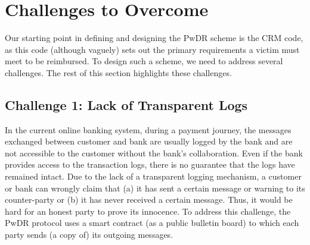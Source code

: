 

\section{Challenges to Overcome}\label{sec:: challenges}


Our starting point in defining and  designing the PwDR scheme is the CRM code, as this code (although vaguely) sets out the primary requirements a victim must meet to be reimbursed.  To design such a scheme, we need to address  several challenges. The rest of this section  highlights these challenges. 





\subsection{Challenge 1: Lack of Transparent Logs} 
In the current online  banking system, during a payment journey, the messages exchanged between customer and bank are usually logged by the bank and are not accessible to the customer without the bank's collaboration. Even if the bank provides access to the transaction logs, there is no guarantee that the logs have remained intact. Due to the lack of a transparent logging mechanism, a customer or bank can wrongly claim that (a) it has sent a certain message or warning to its counter-party or (b) it has never  received a certain message.  Thus, it would be hard for an honest party  to prove its innocence. To address this challenge, the PwDR protocol uses a  smart contract (as a public bulletin board) to which  each party sends (a copy of) its outgoing messages. %




